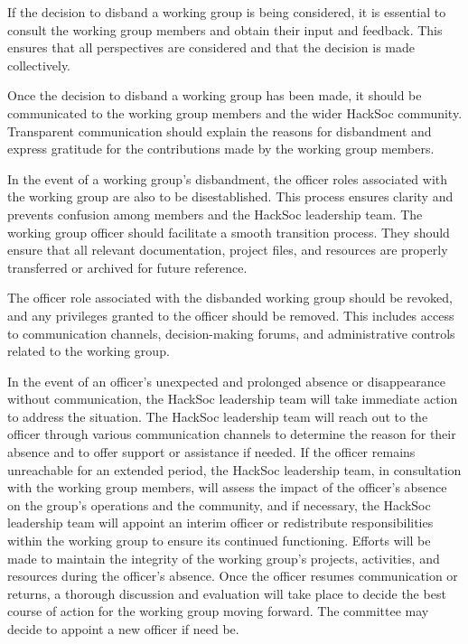 \begin{subclause}
If the decision to disband a working group is being considered, it is essential to consult the working group members and obtain their input and feedback. This ensures that all perspectives are considered and that the decision is made collectively.
\end{subclause}

\begin{subclause}
Once the decision to disband a working group has been made, it should be communicated to the working group members and the wider HackSoc community. Transparent communication should explain the reasons for disbandment and express gratitude for the contributions made by the working group members.
\end{subclause}

\begin{subclause}
In the event of a working group's disbandment, the officer roles associated with the working group are also to be disestablished. This process ensures clarity and prevents confusion among members and the HackSoc leadership team. The working group officer should facilitate a smooth transition process. They should ensure that all relevant documentation, project files, and resources are properly transferred or archived for future reference.
\end{subclause}

\begin{subclause}
The officer role associated with the disbanded working group should be revoked, and any privileges granted to the officer should be removed. This includes access to communication channels, decision-making forums, and administrative controls related to the working group.
\end{subclause}

\begin{subclause}
In the event of an officer's unexpected and prolonged absence or disappearance without communication, the HackSoc leadership team will take immediate action to address the situation. The HackSoc leadership team will reach out to the officer through various communication channels to determine the reason for their absence and to offer support or assistance if needed. If the officer remains unreachable for an extended period, the HackSoc leadership team, in consultation with the working group members, will assess the impact of the officer's absence on the group's operations and the community, and if necessary, the HackSoc leadership team will appoint an interim officer or redistribute responsibilities within the working group to ensure its continued functioning. Efforts will be made to maintain the integrity of the working group's projects, activities, and resources during the officer's absence. Once the officer resumes communication or returns, a thorough discussion and evaluation will take place to decide the best course of action for the working group moving forward. The committee may decide to appoint a new officer if need be.
\end{subclause}